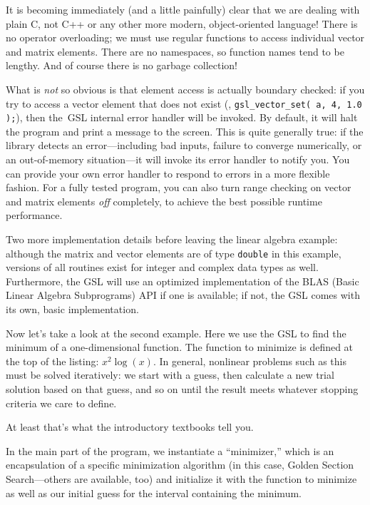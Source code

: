 It is becoming immediately (and a little painfully) clear that we are
dealing with plain C, not C++ or any other more modern,
object-oriented language! There is no operator overloading; we must
use regular functions to access individual vector and matrix elements.
There are no namespaces, so function names tend to be lengthy. And of
course there is no garbage collection!

What is \emph{not} so obvious is that element access is actually
boundary checked: if you try to access a vector element that does not 
exist (\eg, \texttt{gsl\_vector\_set( a, 4, 1.0 );}), then the~GSL
internal error handler will be invoked. By default, it will halt the
program and print a message to the screen.  This is\vadjust{\pagebreak} quite generally
true: if the library detects an error---including bad inputs, failure
to converge numerically, or an out-of-memory situation---it will
invoke its error handler to notify you. You can provide your own error
handler to respond to errors in a more flexible fashion.  For a fully
tested program, you can also turn range checking on vector and matrix
elements \emph{off} completely, to achieve the best possible runtime
performance.

Two more implementation details before leaving the linear algebra
example: although the matrix and vector elements are of type
\texttt{double} in this example, versions of all routines exist for
integer and complex data types as well. Furthermore, the GSL will use
an optimized implementation of the BLAS (Basic Linear Algebra
Subprograms) API if one is available; if not, the GSL comes with its
own, basic implementation.

Now let's take a look at the second example. Here we use the GSL to
find the minimum of a one-dimensional function. The function to
minimize is defined at the top of the listing: $x^2 \log(x)$. In
general, nonlinear problems such as this must be solved iteratively:
we start with a guess, then calculate a new trial solution based on
that guess, and so on until the result meets whatever stopping
criteria we care to define.

At least that's what the introductory textbooks tell you.

In the main part of the program, we instantiate a ``minimizer,'' which
is an encapsulation of a specific minimization algorithm (in this
case, Golden Section Search---others are available, too) and
initialize it with the function to minimize as well as our initial
guess for the interval containing the minimum.

